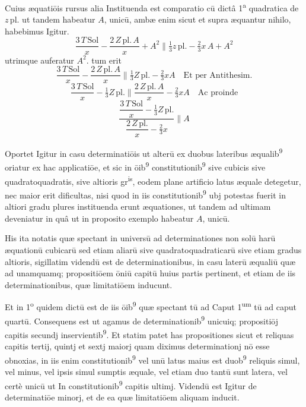 \documentclass[11pt,a4paper]{article}
\begin{document}
Cuius æquatiōis rursus alia Instituenda est comparatio cū dictâ 1\textsuperscript{a} quadratica de $z\,\mathrm{pl.}$ ut tandem habeatur $A$, unicū, ambæ enim sicut et supra æquantur nihilo, habebimus Igitur.
\[ \frac{3\,T\,\mathrm{Sol}}{x} - \frac{2\,Z\,\mathrm{pl.}\,A}{x} + A^{2} \parallel \tfrac{1}{3}z\,\mathrm{pl.} - \tfrac{2}{3}x\,A + A^{2} \]
utrimque auferatur $A^{2}$. tum erit
\[ \frac{3\,T\,\mathrm{Sol}}{x} - \frac{2\,Z\,\mathrm{pl.}\,A}{x} \parallel \tfrac{1}{3}Z\,\mathrm{pl.} - \tfrac{2}{3}xA \quad \text{Et per Antithesim.} \]
\[ \frac{3\,T\,\mathrm{Sol}}{x} - \tfrac{1}{3}Z\,\mathrm{pl.} \parallel \frac{2\,Z\,\mathrm{pl.}\,A}{x} - \tfrac{2}{3}xA \quad \text{Ac proinde} \]
\[ \frac{\dfrac{3\,T\,\mathrm{Sol}}{x} - \tfrac{1}{3}Z\,\mathrm{pl.}}{\dfrac{2\,Z\,\mathrm{pl.}}{x} - \tfrac{2}{3}x} \parallel A \]

Oportet Igitur in casu determinatiōis ut alterū ex duobus lateribus æqualib\textsuperscript{9} oriatur ex hac applicatiōe, et sic in ōib\textsuperscript{9} constitutionib\textsuperscript{9} sive cubicis sive quadratoquadratis, sive altioris gr\textsuperscript{is}, eodem plane artificio latus æquale detegetur, nec maior erit dificultas, nisi quod in iis constitutionib\textsuperscript{9} ubj potestas fuerit in altiori gradu plures instituenda erunt æquationes, ut tandem ad ultimam deveniatur in quâ ut in proposito exemplo habeatur $A$, unicū.

His ita notatis quæ spectant in universū ad determinationes non solū harū æquationū cubicarū sed etiam aliarū sive quadratoquadraticarū sive etiam gradus altioris, sigillatim videndū est de determinationibus, in casu laterū æqualiū quæ ad unamquamq; propositiōem ōniū capitū huius partis pertinent, et etiam de iis determinationibus, quæ limitatiōem inducunt.

Et in 1\textsuperscript{o} quidem dictū est de iis ōib\textsuperscript{9} quæ spectant tū ad Caput 1\textsuperscript{um} tū ad caput quartū. Consequens est ut agamus de determinationib\textsuperscript{9} unicuiq; propositiōj capitis secundj inservientib\textsuperscript{9}. Et statim patet has propositiones sicut et reliquas capitis tertij, quintj et sextj maiorj quam diximus determinationj nō esse obnoxias, in iis enim constitutionib\textsuperscript{9} vel unū latus maius est duob\textsuperscript{9} reliquis simul, vel minus, vel ipsis simul sumptis æquale, vel etiam duo tantū sunt latera, vel certè unicū ut In constitutionib\textsuperscript{9} capitis ultimj. Videndū est Igitur de determinatiōe minorj, et de ea quæ limitatiōem aliquam inducit.
\end{document}
